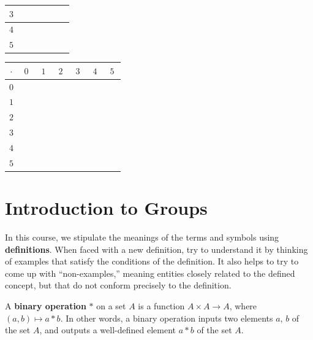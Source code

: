 \begin{enumerate}
\begin{center}
\begin{tabular}{|c||c|c|c|c|c|c|}
        $3$ & & & & & & \\ \hline
        $4$ & & & & & & \\ \hline
        $5$ & & & & & & \\ \hline
    \end{tabular}
    \hspace{0.5in}
    \begin{tabular}{|c||c|c|c|c|c|c|} \hline
        $\cdot$ & $0$ & $1$ & $2$ & $3$ & $4$ & $5$ \\ \hline \hline
        $0$ & $\phantom{00}$ & $\phantom{00}$ & $\phantom{00}$ & $\phantom{00}$ & $\phantom{00}$ & $\phantom{00}$ \\ \hline
        $1$ & & & & & & \\ \hline
        $2$ & & & & & & \\ \hline
        $3$ & & & & & & \\ \hline
        $4$ & & & & & & \\ \hline
        $5$ & & & & & & \\ \hline
    \end{tabular}
    \end{center}
\end{enumerate}

\chapter{Introduction to Groups}\label{chap:introgps}

In this course, we stipulate the meanings of the terms and symbols using \textbf{definitions}. When faced with a new definition, try to understand it by thinking of examples that satisfy the conditions of the definition.  It also helps to try to come up with ``non-examples,'' meaning entities closely related to the defined concept, but that do not conform precisely to the definition.

\begin{definition}
    A \textbf{binary operation} \(*\) on a set \(A\) is a function \(A \times A \rightarrow A\), where \((a,b) \mapsto a*b\).  In other words, a binary operation inputs two elements \(a\), \(b\) of the set \(A\), and outputs a well-defined element \(a * b\) of the set \(A\).
\end{definition}

